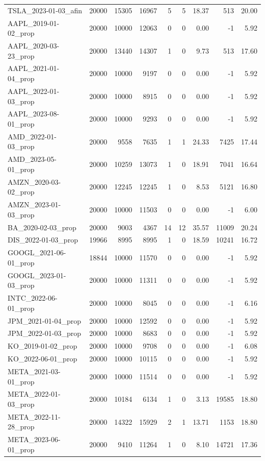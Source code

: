 \documentclass[10pt,a4paper,landscape]{article}
\begin{document}
\begin{longtable}{lrrrrrrrr}
TSLA\_2023-01-03\_afin & 20000 & 15305 & 16967 & 5 & 5 & 18.37 & 513 & 20.00 \\
AAPL\_2019-01-02\_prop & 20000 & 10000 & 12063 & 0 & 0 & 0.00 & -1 & 5.92 \\
AAPL\_2020-03-23\_prop & 20000 & 13440 & 14307 & 1 & 0 & 9.73 & 513 & 17.60 \\
AAPL\_2021-01-04\_prop & 20000 & 10000 & 9197 & 0 & 0 & 0.00 & -1 & 5.92 \\
AAPL\_2022-01-03\_prop & 20000 & 10000 & 8915 & 0 & 0 & 0.00 & -1 & 5.92 \\
AAPL\_2023-08-01\_prop & 20000 & 10000 & 9293 & 0 & 0 & 0.00 & -1 & 5.92 \\
AMD\_2022-01-03\_prop & 20000 & 9558 & 7635 & 1 & 1 & 24.33 & 7425 & 17.44 \\
AMD\_2023-05-01\_prop & 20000 & 10259 & 13073 & 1 & 0 & 18.91 & 7041 & 16.64 \\
AMZN\_2020-03-02\_prop & 20000 & 12245 & 12245 & 1 & 0 & 8.53 & 5121 & 16.80 \\
AMZN\_2023-01-03\_prop & 20000 & 10000 & 11503 & 0 & 0 & 0.00 & -1 & 6.00 \\
BA\_2020-02-03\_prop & 20000 & 9003 & 4367 & 14 & 12 & 35.57 & 11009 & 20.24 \\
DIS\_2022-01-03\_prop & 19966 & 8995 & 8995 & 1 & 0 & 18.59 & 10241 & 16.72 \\
GOOGL\_2021-06-01\_prop & 18844 & 10000 & 11570 & 0 & 0 & 0.00 & -1 & 5.92 \\
GOOGL\_2023-01-03\_prop & 20000 & 10000 & 11311 & 0 & 0 & 0.00 & -1 & 5.92 \\
INTC\_2022-06-01\_prop & 20000 & 10000 & 8045 & 0 & 0 & 0.00 & -1 & 6.16 \\
JPM\_2021-01-04\_prop & 20000 & 10000 & 12592 & 0 & 0 & 0.00 & -1 & 5.92 \\
JPM\_2022-01-03\_prop & 20000 & 10000 & 8683 & 0 & 0 & 0.00 & -1 & 5.92 \\
KO\_2019-01-02\_prop & 20000 & 10000 & 9708 & 0 & 0 & 0.00 & -1 & 6.08 \\
KO\_2022-06-01\_prop & 20000 & 10000 & 10115 & 0 & 0 & 0.00 & -1 & 5.92 \\
META\_2021-03-01\_prop & 20000 & 10000 & 11514 & 0 & 0 & 0.00 & -1 & 5.92 \\
META\_2022-01-03\_prop & 20000 & 10184 & 6134 & 1 & 0 & 3.13 & 19585 & 18.80 \\
META\_2022-11-28\_prop & 20000 & 14322 & 15929 & 2 & 1 & 13.71 & 1153 & 18.80 \\
META\_2023-06-01\_prop & 20000 & 9410 & 11264 & 1 & 0 & 8.10 & 14721 & 17.36 \\

\end{longtable}
\end{document}
